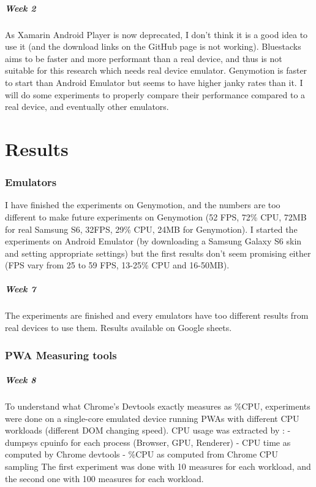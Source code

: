 \documentclass{kththesis}
\begin{document}
\paragraph{Week 2}
As Xamarin Android Player is now deprecated, I don't think it is a good idea to use it (and the download links on the GitHub page is not working). Bluestacks aims to be faster and more performant than  a real device, and thus is not suitable for this research which needs real device emulator. Genymotion is faster to start than Android Emulator but seems to have higher janky rates than it. I will do some experiments to properly compare their performance compared to a real device, and eventually other emulators.

\fi


\chapter{Results}
\subsection{Emulators}
I have finished the experiments on Genymotion, and the numbers are too different to make future experiments on Genymotion (52 FPS, 72\% CPU, 72MB for real Samsung S6, 32FPS, 29\% CPU, 24MB for Genymotion). I started the experiments on Android Emulator (by downloading a Samsung Galaxy S6 skin and setting appropriate settings) but the first results don't seem promising either (FPS vary from 25 to 59 FPS, 13-25\% CPU and 16-50MB).

\paragraph{Week 7}
The experiments are finished and every emulators have too different results from real devices to use them. 
Results available on Google sheets.

\subsection{PWA Measuring tools}
\paragraph{Week 8}
To understand what Chrome's Devtools exactly measures as \%CPU, experiments were done on a single-core emulated device running PWAs with different CPU workloads (different DOM changing speed). CPU usage was extracted by :
    - dumpsys cpuinfo for each process (Browser, GPU, Renderer)
    - CPU time as computed by Chrome devtools
    - \%CPU as computed from Chrome CPU sampling
The first experiment was done with 10 measures for each workload, and the second one with 100 measures for each workload.
\end{document}
